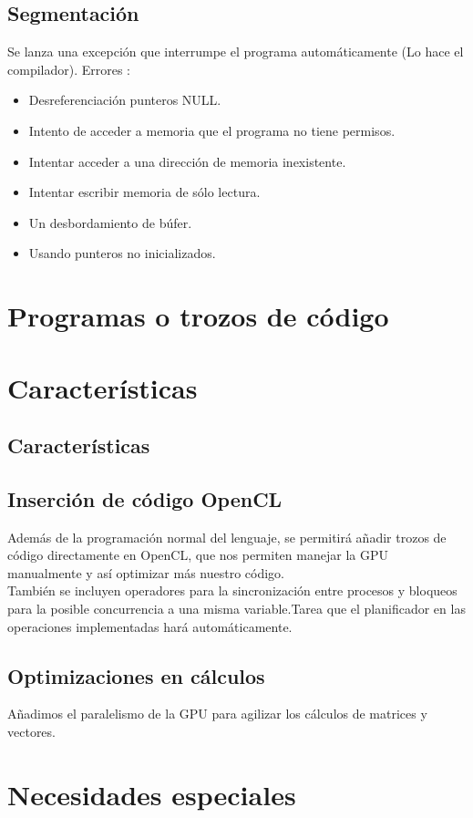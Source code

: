 \documentclass[12pt,a4paper]{article}
\begin{document}
\subsection{Segmentación}
Se lanza una excepción que interrumpe el programa automáticamente (Lo hace el compilador).
Errores :
\begin{itemize}
\item Desreferenciación punteros NULL.
\item Intento de acceder a memoria que el programa no tiene permisos.
\item Intentar acceder a una dirección de memoria inexistente.
\item Intentar escribir memoria de sólo lectura.
\item Un desbordamiento de búfer. 
\item Usando punteros no inicializados.
\end{itemize}
\section{Programas o trozos de código}
\section{Características}
\subsection{Características}
\subsection{Inserción de código OpenCL}
Además de la programación normal del lenguaje, se permitirá añadir trozos de código directamente en OpenCL, que nos permiten manejar la GPU manualmente y así optimizar más nuestro código. 
 \\ También se incluyen operadores para la sincronización entre procesos y bloqueos para la posible concurrencia a una misma variable.Tarea que el planificador en las operaciones implementadas hará automáticamente.
\subsection{Optimizaciones en cálculos}
Añadimos el paralelismo de la GPU para agilizar los cálculos de matrices y vectores. 
\section{Necesidades especiales}
\end{document}
